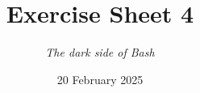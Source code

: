 




\title{{\vspace{-12mm}\huge\textbf{Exercise Sheet 4}}}
\author{\textit{The dark side of Bash}}
\date{{\small 20 February 2025}}


    \maketitle
    \bigskip
    
    \bigskip
    
    \bigskip
    
    \bigskip
    
